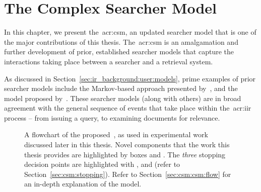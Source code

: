 
\chapter[The Complex Searcher Model]{The Complex Searcher Model}\label{chap:csm}
In this chapter, we present the~\gls{acr:csm}, an updated searcher model that is one of the major contributions of this thesis. The~\gls{acr:csm} is an amalgamation and further development of prior, established searcher models that capture the interactions taking place between a searcher and a retrieval system.

As discussed in Section~\ref{sec:ir_background:user:models}, prime examples of prior searcher models include the Markov-based approach presented by~\cite{baskaya2013behavioural_factors}, and the model proposed by~\cite{thomas2014modelling_behaviour}. These searcher models (along with others) are in broad agreement with the general sequence of events that take place within the~\gls{acr:iir} process -- from issuing a query, to examining documents for relevance.



\begin{figure}[t!]
    \centering
    \caption[Flowchart of the~]{A flowchart of the proposed~, as used in experimental work discussed later in this thesis. Novel components that the work this thesis provides are highlighted by boxes  and . The \emph{three} stopping decision points are highlighted with ,  and  (refer to Section~\ref{sec:csm:stopping}). Refer to Section~\ref{sec:csm:csm:flow} for an in-depth explanation of the model.}
    \label{fig:csm}
\end{figure}